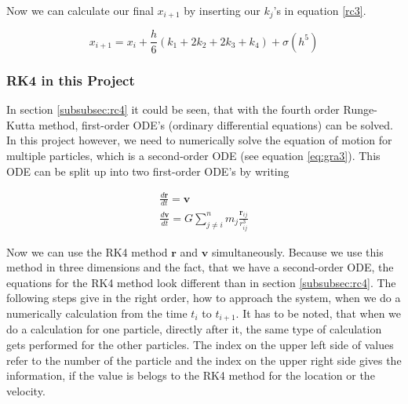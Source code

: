\documentclass[10pt,a4paper]{article}
\begin{document}
Now we can calculate our final $x_{i+1}$ by inserting our $k_j$'s in equation \eqref{rc3}.

\begin{equation}
\label{rc9}
x_{i+1} =  x_i + \frac{h}{6} (k_1 + 2 k_2 + 2 k_3 + k_4) + \sigma(h^5)
\end{equation}

\subsubsection{RK4 in this Project}

In section \ref{subsubsec:rc4} it could be seen, that with the fourth order Runge-Kutta method, first-order ODE's (ordinary differential equations) can be solved. In this project however, we need to numerically solve the equation of motion for multiple particles, which is a second-order ODE (see equation \eqref{eq:gra3}). This ODE can be split up into two first-order ODE's by writing

\begin{align}
\frac{d\mathbf{r}}{dt} = \mathbf{v}  \\
\frac{d\mathbf{v}}{dt} = G \sum_{j \neq i}^{n} m_j \frac{\mathbf{r}_{ij}}{r_{ij}^3}
\end{align}

Now we can use the RK4 method $\mathbf{r}$ and $\mathbf{v}$ simultaneously. Because we use this method in three dimensions and the fact, that we have a second-order ODE, the equations for the RK4 method look different than in section \ref{subsubsec:rc4}. The following steps give in the right order, how to approach the system, when we do a numerically calculation from the time $t_i$ to $t_{i+1}$. It has to be noted, that when we do a calculation for one particle, directly after it, the same type of calculation gets performed for the other particles. The index on the upper left side of values refer to the number of the particle and the index on the upper right side gives the information, if the value is belogs to the RK4 method for the location or the velocity.
\end{document}
